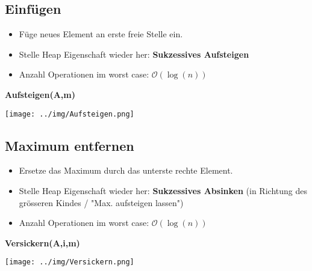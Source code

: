 \documentclass[german]{latex4ei/latex4ei_sheet}
\begin{document}
\begin{sectionbox}
\subsection{Einfügen}\smallskip
\begin{itemize}
    \item Füge neues Element an erste freie Stelle ein.
    \item Stelle Heap Eigenschaft wieder her: \textbf{Sukzessives Aufsteigen}
    \item Anzahl Operationen im worst case: $\mathcal{O}(\operatorname{log}(n))$
\end{itemize}\smallskip
\textbf{Aufsteigen(A,m)}\par
\texttt{[image: ../img/Aufsteigen.png]}
\end{sectionbox}

\begin{sectionbox}
\subsection{Maximum entfernen}\smallskip
\begin{itemize}
    \item Ersetze das Maximum durch das unterste rechte Element.
    \item Stelle Heap Eigenschaft wieder her: \textbf{Sukzessives Absinken} (in Richtung des grösseren Kindes / "Max. aufsteigen lassen")
    \item Anzahl Operationen im worst case: $\mathcal{O}(\operatorname{log}(n))$
\end{itemize}\smallskip
\textbf{Versickern(A,i,m)}\par
\texttt{[image: ../img/Versickern.png]}
\end{sectionbox}
\end{document}
